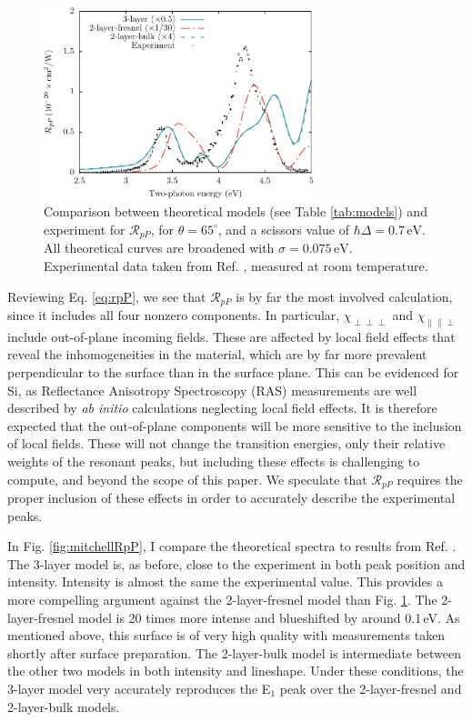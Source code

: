 \begin{figure}
\centering 
\includegraphics[width=0.7\textwidth]{figures/fig-4_4_05}
\caption{Comparison between theoretical models (see Table \ref{tab:models}) and
experiment for $\mathcal{R}_{pP}$, for $\theta=65^{\circ}$, and a scissors
value of $\hbar\Delta = 0.7\,\text{eV}$. All theoretical curves are broadened
with $\sigma=0.075\,\text{eV}$. Experimental data taken from Ref.
\cite{mejiaPRB02}, measured at room temperature.}
\label{fig:RpP}
\end{figure}

Reviewing Eq. \eqref{eq:rpP}, we see that $\mathcal{R}_{pP}$ is by far the most involved calculation, since it includes all four nonzero components. In particular, $\chi_{\perp\perp\perp}$ and $\chi_{\parallel\parallel\perp}$ include out-of-plane incoming fields. These are affected by local field effects\cite{tancognedejean:tel-01235611} that reveal the inhomogeneities in the material, which are by far more prevalent perpendicular to the surface than in the surface plane. This can be evidenced for Si, as Reflectance Anisotropy Spectroscopy (RAS) measurements are well described by \emph{ab initio} calculations neglecting local field effects.\cite{palummoPRB99, gaalPRB09} It is therefore expected that the out-of-plane components will be more sensitive to the inclusion of local fields. These will not change the transition energies, only their relative weights of the resonant peaks,\cite{tancognedejean:tel-01235611} but including these effects is challenging to compute,\cite{nicolasPRB15} and beyond the scope of this paper. We speculate that $\mathcal{R}_{pP}$ requires the proper inclusion of these effects in order to accurately describe the experimental peaks.

In Fig. \ref{fig:mitchellRpP}, I compare the theoretical spectra to results from
Ref. \cite{mitchellSS01}. The 3-layer model is, as before, close to the
experiment in both peak position and intensity. Intensity is almost the same the
experimental value. This provides a more compelling argument against the
2-layer-fresnel model than Fig. \ref{fig:RpP}. The 2-layer-fresnel model is 20
times more intense and blueshifted by around 0.1\,eV. As mentioned above, this
surface is of very high quality with measurements taken shortly after surface
preparation. The 2-layer-bulk model is intermediate between the other two models
in both intensity and lineshape. Under these conditions, the 3-layer model very
accurately reproduces the E$_{1}$ peak over the 2-layer-fresnel and 2-layer-bulk
models.

